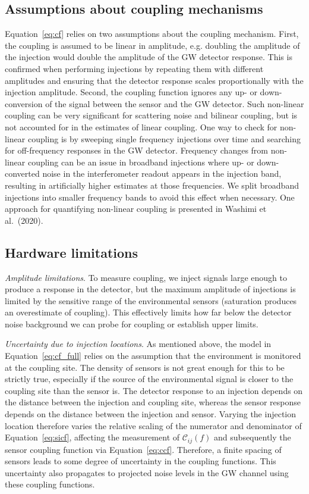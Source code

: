 \subsection{Assumptions about coupling mechanisms}

Equation~\ref{eq:cf} relies on two assumptions about the coupling mechanism.
First, the coupling is assumed to be linear in amplitude, e.g. doubling the amplitude of the injection would double the amplitude of the \ac{GW} detector response.
This is confirmed when performing injections by repeating them with different amplitudes and ensuring that the detector response scales proportionally with the injection amplitude.
Second, the coupling function ignores any up- or down-conversion of the signal between the sensor and the \ac{GW} detector.
Such non-linear coupling can be very significant for scattering noise and bilinear coupling, but is not accounted for in the estimates of linear coupling.
One way to check for non-linear coupling is by sweeping single frequency injections over time and searching for off-frequency responses in the \ac{GW} detector.
Frequency changes from non-linear coupling can be an issue in broadband injections where up- or down-converted noise in the interferometer readout appears in the injection band, resulting in artificially higher estimates at those frequencies.
We split broadband injections into smaller frequency bands to avoid this effect when necessary.
One approach for quantifying non-linear coupling is presented in Washimi et al.\ (2020).%

\subsection{Hardware limitations}

\textit{Amplitude limitations}. To measure coupling, we inject signals large enough to produce a response in the detector, but the maximum amplitude of injections is limited by the sensitive range of the environmental sensors (saturation produces an overestimate of coupling).
This effectively limits how far below the detector noise background we can probe for coupling or establish upper limits.

\textit{Uncertainty due to injection locations}.
As mentioned above, the model in Equation~\ref{eq:cf_full} relies on the assumption that the environment is monitored at the coupling site.
The density of sensors is not great enough for this to be strictly true, especially if the source of the environmental signal is closer to the coupling site than the sensor is.
The detector response to an injection depends on the distance between the injection and coupling site, whereas the sensor response depends on the distance between the injection and sensor.
Varying the injection location therefore varies the relative scaling of the numerator and denominator of Equation~\ref{eq:sicf}, affecting the measurement of $\mathcal{C}_{ij}(f)$ and subsequently the sensor coupling function via Equation~\ref{eq:ccf}.
Therefore, a finite spacing of sensors leads to some degree of uncertainty in the coupling functions.
This uncertainty also propagates to projected noise levels in the \ac{GW} channel using these coupling functions.

